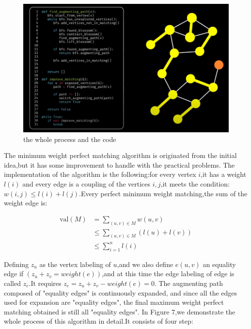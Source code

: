 \documentclass[
	a4paper, %
	10pt, %
	unnumberedsections, %
	twoside, %
]{LTJournalArticle}
\begin{document}
\begin{enumerate}
\begin{figure}
	\setlength{\abovecaptionskip}{0.cm} 
	\includegraphics[width=\linewidth]{img/blossom algorithm 9.png}
	\caption{the whole process and the code}
\end{figure}
\end{enumerate}	
	The minimum weight perfect matching algorithm is originated from the initial idea,but it has some improvement to handle with the practical problems.
	The implementation of the algorithm is the following:for every vertex $i$,it has a weight $l(i)$ and every edge is a coupling of the vertices $i,j$,it meets the condition:$w(i,j) \leq l(i)+l(j)$.Every perfect minimum weight matching,the sum of the weight edge is:
\begin{center}
\begin{align*}
    \text{val}(M) &= \sum_{(u,v)\in M}w(u,v) \\
    &\leq \sum_{(u,v)\in M}(l(u)+l(v)) \\
    &\leq \sum_{i=1}^{n}l(i)
\end{align*}
\end{center}
Defining $z_u$ as the vertex labeling of $u$,and we also define $e(u,v)$ an equality edge if $(z_u+z_v=weight(e))$,and at this time the edge labeling of edge is called $z_e$.It requires $z_e=z_u+z_v-weight(e)=0$.
The augmenting path composed of "equality edges" is continuously expanded, and since all the edges used for expansion are "equality edges", the final maximum weight perfect matching obtained is still all "equality edges".
In Figure 7,we demonstrate the whole process of this algorithm in detail.It consists of four step:
\end{document}
